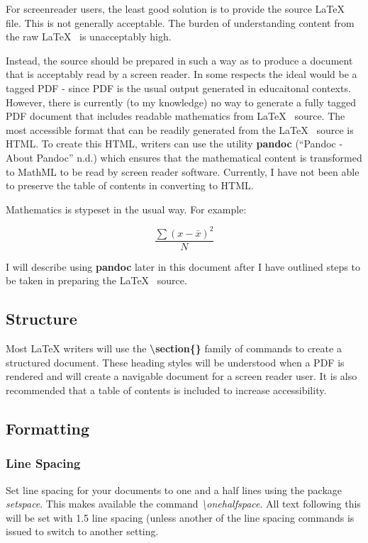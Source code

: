 \documentclass[]{article}
\begin{document}
For screenreader users, the least good solution is to provide the source
\LaTeX~ file. This is not generally acceptable. The burden of
understanding content from the raw \LaTeX~ is unacceptably high.

Instead, the source should be prepared in such a way as to produce a
document that is acceptably read by a screen reader. In some respects
the ideal would be a tagged PDF - since PDF is the usual output
generated in educaitonal contexts. However, there is currently (to my
knowledge) no way to generate a fully tagged PDF document that includes
readable mathematics from \LaTeX~ source. The most accessible format
that can be readily generated from the \LaTeX~ source is HTML.  To create this HTML, 
writers can use the utility \textbf{pandoc} (``Pandoc - About
Pandoc'' n.d.) which ensures that the mathematical content is
transformed to MathML to be read by screen reader software. Currently, I
have not been able to preserve the table of contents in converting to
HTML.

Mathematics is stypeset in the usual way. For example:

\[\frac{\sum{(x-\bar{x})^2}}{N}\]

I will describe using \textbf{pandoc} later in this document after I
have outlined steps to be taken in preparing the \LaTeX~ source.

\hypertarget{structure}{%
\subsection{Structure}\label{structure}}

Most LaTeX writers will use the \textbf{\textbackslash{}section\{\}}
family of commands to create a structured document. These heading styles
will be understood when a PDF is rendered and will create a navigable
document for a screen reader user. It is also recommended that a table
of contents is included to increase accessibility.

\hypertarget{formatting}{%
\subsection{Formatting}\label{formatting}}

\hypertarget{linespacing}{%
\subsubsection{Line Spacing}\label{linespacing}}

Set line spacing for your documents to one and a half lines using the package \emph{setspace}.  This makes available the command
\emph{\textbackslash onehalfspace}.  All text following this will be set with 1.5 line spacing (unless another
of the line spacing commands is issued to switch to another setting.
\end{document}

